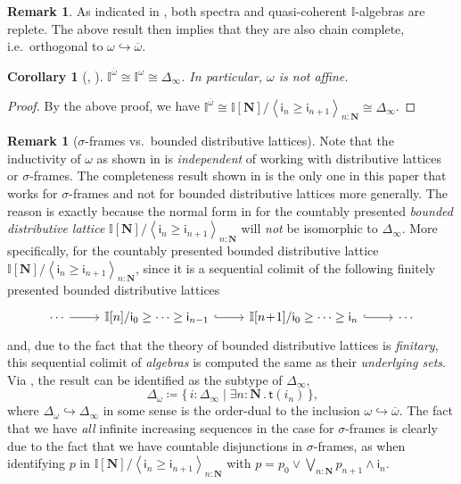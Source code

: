 \documentclass[a4paper,12pt]{amsart}
\newtheorem{corollary}[theorem]{Corollary}
\theoremstyle{definition}
\newtheorem{remark}[theorem]{Remark}
\newcommand{\mb}[1]{\mathbf{#1}}
\newcommand{\mbb}[1]{\mathbb{#1}}
\newcommand{\I}{\mbb I}
\newcommand{\ms}[1]{\mathsf{#1}}
\newcommand{\ov}[1]{\overline{#1}}
\newcommand{\pair}[1]{\left\langle#1\right\rangle}
\newcommand{\scomp}[2]{\{\,#1\mid#2\,\}}
\newcommand{\hook}{\hookrightarrow}
\newcommand{\N}{\mb N}
\newcommand{\ex}[2]{\exists #1\!\colon\!\!#2\mathpunct{.}}
\newcommand\istsym{\ms{t}}
\newcommand\ist[1]{\istsym(#1)}
\begin{document}
\begin{remark}
  As indicated in , both spectra and quasi-coherent $\I$-algebras are replete. The above result then implies that they are also chain complete, i.e.\ orthogonal to $\omega\hook\ov\omega$.
\end{remark}

\begin{corollary}[\AxiomNT, \AxiomSQCC]
  $\I^{\ov\omega} \cong \I^\omega \cong \Delta_\infty$. In particular, $\omega$ is not affine.
\end{corollary}
\begin{proof}
  By the above proof, we have $\I^{\ov\omega} \cong \I[\N]/\pair{\ms{i}_n \ge \ms{i}_{n+1}}_{n:\N} \cong \Delta_\infty$.
\end{proof}

\begin{remark}[$\sigma$-frames vs.\ bounded distributive lattices]\label{rem:whynotdis}
  Note that the inductivity of $\omega$ as shown in  is \emph{independent} of working with distributive lattices or $\sigma$-frames. The completeness result shown in  is the only one in this paper that works for $\sigma$-frames and not for bounded distributive lattices more generally. The reason is exactly because the normal form in  for the countably presented \emph{bounded distributive lattice} $\I[\N]/\pair{\ms{i}_n \ge \ms{i}_{n+1}}_{n:\N}$ will \emph{not} be isomorphic to $\Delta_\infty$. More specifically, for the countably presented bounded distributive lattice $\I[\N]/\pair{\ms{i}_n \ge \ms{i}_{n+1}}_{n:\N}$, since it is a sequential colimit of the following finitely presented bounded distributive lattices
  \[ 
  \begin{tikzcd}
    \cdots \ar[r] & \I[n]/\ms{i}_{0} \ge \cdots \ge \ms{i}_{n-1} \ar[r, hook] & \I[n\!+\!1]/\ms{i}_0 \ge \cdots \ge \ms{i}_n \ar[r, hook] & \cdots
  \end{tikzcd}
  \]
  and, due to the fact that the theory of bounded distributive lattices is \emph{finitary}, this sequential colimit of \emph{algebras} is computed the same as their \emph{underlying sets}. Via , the result can be identified as the subtype of $\Delta_\infty$,
  \[ \Delta_\omega \coloneq \scomp{i : \Delta_\infty}{\ex n\N \ist{i_n}}\text{,} \]
  where $\Delta_\omega \hook \Delta_\infty$ in some sense is the order-dual to the inclusion $\omega\hook\ov\omega$. The fact that we have \emph{all} infinite increasing sequences in the case for $\sigma$-frames is clearly due to the fact that we have countable disjunctions in $\sigma$-frames, as when identifying $p$ in $\I[\N]/\pair{\ms{i}_n \ge \ms{i}_{n+1}}_{n:\N}$ with $p = p_0 \vee \bigvee_{n:\N}p_{n+1}\wedge \ms{i}_n$.
\end{remark}
\end{document}

